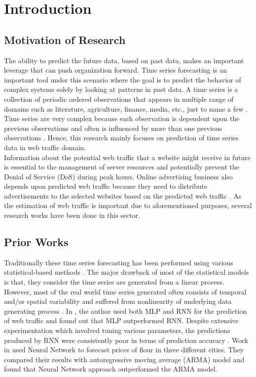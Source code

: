 
  \section{Introduction}



    \subsection{Motivation of Research}
   	\indent \indent The ability to predict the future data, based on past data, makes an important leverage that can push organization forward.
      Time series forecasting is an important tool under this scenario where the goal is to predict the behavior of complex systems solely by looking at patterns in past data. 
       A time series is a collection of periodic ordered observations  that appears  in multiple range of domains such as literature, agriculture, finance, media, etc., just to name a few \cite{paulo}. 
  	 Time series are very complex because each observation is dependent upon the previous observations and often is influenced by more than one previous observations \cite{anne}. Hence, this research mainly focuses on prediction of time series data in web traffic domain.\\
    Information about the potential web traffic that a website might receive in future is essential to the management of server resources and potentially prevent the Denial of Service (DoS) during peak hours. Online advertising business also depends upon predicted web traffic because they need to distribute advertisements to the selected websites based on the predicted web traffic \cite{rojaa}.
    As the estimation of web traffic is important due to aforementioned purposes, several research works have been done in this sector.\\
  
    \subsection{Prior Works}
  
    Traditionally these time series forecasting has been performed using various statistical-based methods \cite{methodsapplications}. The major drawback of most of the statistical models is that, they consider the time series are generated from a linear process. However, most of the real world time series generated often consists of temporal and/or spatial variability and suffered from nonlinearity of underlying data generating process \cite{Panigrahi_timeseries}. 
  In \cite{rojaa}, the author used both MLP and RNN for the prediction of web traffic and found out that MLP outperformed RNN. Despite extensive experimentation which involved tuning various parameters, the predictions produced by RNN were consistently poor in terms of prediction accuracy \cite{rojaa}.
  Work in \cite{chakraborty} used Neural Network to forecast prices of flour in three different cities. They compared their results with autoregressive moving average (ARMA)  model and found that Neural Network approach outperformed the ARMA model. 

